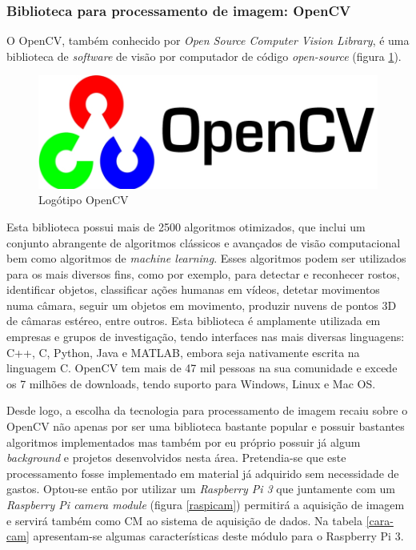 \subsubsection{Biblioteca para processamento de imagem: OpenCV}

O OpenCV, também conhecido por \textit{Open Source Computer Vision Library}, é uma biblioteca de \textit{software} de visão por computador de código \textit{open-source} (figura \ref{opencvlogo}). 

\begin{figure}[!htb]
	\centering
	\includegraphics[width=0.3\linewidth]{img/vision/opencv_logo.jpg}
	\caption{Logótipo OpenCV}
	\label{opencvlogo}
\end{figure}

Esta biblioteca possui mais de 2500 algoritmos otimizados, que inclui um conjunto abrangente de algoritmos clássicos e avançados de visão computacional bem como algoritmos de \textit{machine learning}. Esses algoritmos podem ser utilizados para os mais diversos fins, como por exemplo, para detectar e reconhecer rostos, identificar objetos, classificar ações humanas em vídeos, detetar movimentos numa câmara, seguir um objetos em movimento, produzir nuvens de pontos 3D de câmaras estéreo, entre outros. Esta biblioteca é amplamente utilizada em empresas e grupos de investigação, tendo interfaces nas mais diversas linguagens: C++, C, Python, Java e MATLAB, embora seja nativamente escrita na linguagem C. OpenCV tem mais de 47 mil pessoas na sua comunidade e excede os 7 milhões de downloads, tendo suporto para Windows, Linux e Mac OS\cite{Itseez}.




Desde logo, a escolha da tecnologia para processamento de imagem recaiu sobre o OpenCV não apenas por ser uma biblioteca bastante popular e possuir bastantes algoritmos implementados mas também por eu próprio possuir já algum \textit{background} e projetos desenvolvidos nesta área.  Pretendia-se que este processamento fosse implementado em material já adquirido sem necessidade de gastos. Optou-se então por utilizar um \textit{Raspberry Pi 3} que juntamente com um \textit{Raspberry Pi camera module} (figura \ref{raspicam}) permitirá a aquisição de imagem e servirá também como \acl{CM} ao sistema de aquisição de dados. Na tabela \ref{cara-cam} apresentam-se algumas características deste módulo para o Raspberry Pi 3. 


